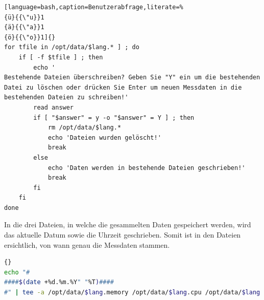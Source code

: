 \documentclass{fancydocument}
\begin{document}
\begin{minipage}{\textwidth}
\begin{lstlisting}[language=bash,caption=Benutzerabfrage,literate=% 
{ü}{{\"u}}1 
{ä}{{\"a}}1 
{ö}{{\"o}}1]{}
for tfile in /opt/data/$lang.* ] ; do
	if [ -f $tfile ] ; then
		echo '
Bestehende Dateien überschreiben? Geben Sie "Y" ein um die bestehenden Datei zu löschen oder drücken Sie Enter um neuen Messdaten in die bestehenden Dateien zu schreiben!'
		read answer
		if [ "$answer" = y -o "$answer" = Y ] ; then
			rm /opt/data/$lang.*
			echo 'Dateien wurden gelöscht!'
			break
		else
			echo 'Daten werden in bestehende Dateien geschrieben!'
			break		
		fi			
	fi
done
\end{lstlisting}
\end{minipage}

In die drei Dateien, in welche die gesammelten Daten gespeichert werden, wird das aktuelle Datum sowie die Uhrzeit geschrieben. Somit ist in den Dateien ersichtlich, von wann genau die Messdaten stammen.

\begin{minipage}{\textwidth}
\begin{lstlisting}[language=bash,caption=Titel einfügen]{}
echo "#
####$(date +%d.%m.%Y" "%T)####
#" | tee -a /opt/data/$lang.memory /opt/data/$lang.cpu /opt/data/$lang.time > /dev/null
\end{lstlisting}
\end{minipage}
\end{document}

